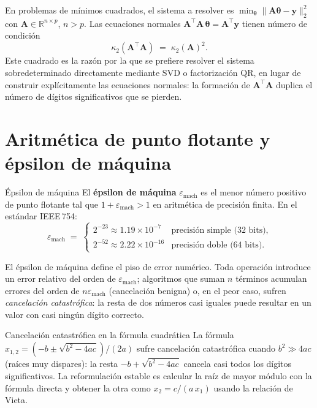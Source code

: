 En problemas de mínimos cuadrados, el sistema a resolver es
$\min_{\boldsymbol{\theta}} \|\mathbf{A}\boldsymbol{\theta} - \mathbf{y}\|_2^2$
con $\mathbf{A} \in \mathbb{R}^{n \times p}$, $n > p$.
Las ecuaciones normales $\mathbf{A}^\top\mathbf{A}\,\boldsymbol{\theta} =
\mathbf{A}^\top\mathbf{y}$ tienen número de condición
\[
  \kappa_2(\mathbf{A}^\top\mathbf{A})
  \;=\; \kappa_2(\mathbf{A})^2.
\]
Este cuadrado es la razón por la que se prefiere resolver el sistema
sobredeterminado directamente mediante SVD o factorización QR, en lugar de
construir explícitamente las ecuaciones normales: la formación de
$\mathbf{A}^\top\mathbf{A}$ duplica el número de dígitos significativos que
se pierden.

\section{Aritmética de punto flotante y épsilon de máquina}
\label{ap:floating_point}

\begin{definicion}{Épsilon de máquina}
\label{def:epsilon_mach}
El \textbf{épsilon de máquina} $\varepsilon_{\mathrm{mach}}$ es el menor
número positivo de punto flotante tal que $1 + \varepsilon_{\mathrm{mach}}
> 1$ en aritmética de precisión finita. En el estándar IEEE\,754:
\[
  \varepsilon_{\mathrm{mach}} \;=\;
  \begin{cases}
    2^{-23} \approx 1.19 \times 10^{-7} & \text{precisión simple (32 bits),} \\[3pt]
    2^{-52} \approx 2.22 \times 10^{-16} & \text{precisión doble (64 bits).}
  \end{cases}
\]
\end{definicion}

El épsilon de máquina define el piso de error numérico. Toda operación
introduce un error relativo del orden de $\varepsilon_{\mathrm{mach}}$;
algoritmos que suman $n$ términos acumulan errores del orden de
$n\varepsilon_{\mathrm{mach}}$ (cancelación benigna) o, en el peor caso,
sufren \emph{cancelación catastrófica}: la resta de dos números casi iguales
puede resultar en un valor con casi ningún dígito correcto.

\begin{ejemplo}{Cancelación catastrófica en la fórmula cuadrática}
La fórmula $x_{1,2} = (-b \pm \sqrt{b^2 - 4ac}) / (2a)$ sufre cancelación
catastrófica cuando $b^2 \gg 4ac$ (raíces muy dispares): la resta
$-b + \sqrt{b^2-4ac}$ cancela casi todos los dígitos significativos. La
reformulación estable es calcular la raíz de mayor módulo con la fórmula
directa y obtener la otra como $x_2 = c / (a\, x_1)$ usando la relación de
Vieta.
\end{ejemplo}

